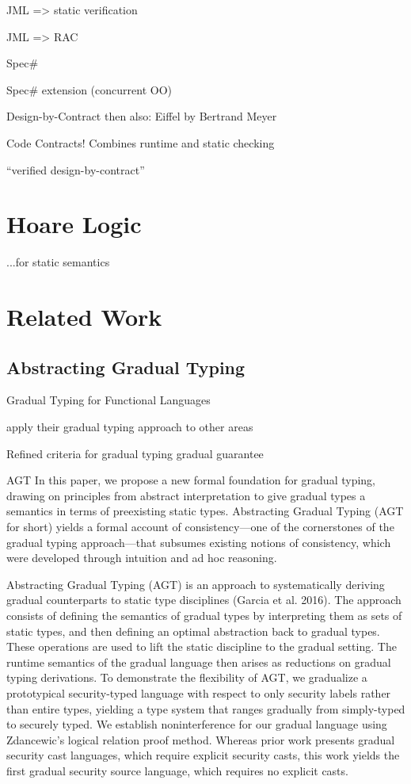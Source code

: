 \cite{jacobs2001logic} JML => static verification

\cite{cheon2002runtime} JML => RAC

\cite{the-spec-programming-system-an-overview} Spec\#

\cite{a-statically-verifiable-programming-model-for-concurrent-object-oriented-programs} Spec\# extension (concurrent OO)

\cite{meyer2002design} Design-by-Contract
then also: Eiffel by Bertrand Meyer 

\cite{embedded-contract-languages} Code Contracts! Combines runtime and static checking

\cite{crocker2004safe} “verified design-by-contract”

\section{Hoare Logic}
...for static semantics

\section{Related Work}
\subsection{Abstracting Gradual Typing}
\cite{siek2006gradual}
Gradual Typing for Functional Languages

apply their gradual typing approach to other areas

\cite{siek2015refined}
Refined criteria for gradual typing
gradual guarantee

\cite{garcia2016abstracting}
AGT
In this paper, we propose a new formal foundation for gradual
typing, drawing on principles from abstract interpretation to
give gradual types a semantics in terms of preexisting static types.
Abstracting Gradual Typing (AGT for short) yields a formal account
of consistency—one of the cornerstones of the gradual typing
approach—that subsumes existing notions of consistency, which
were developed through intuition and ad hoc reasoning.

\cite{garcia2015deriving}
Abstracting Gradual Typing (AGT) is an approach to systematically
deriving gradual counterparts to static type disciplines (Garcia
et al. 2016). The approach consists of defining the semantics of
gradual types by interpreting them as sets of static types, and then
defining an optimal abstraction back to gradual types. These operations
are used to lift the static discipline to the gradual setting. The
runtime semantics of the gradual language then arises as reductions
on gradual typing derivations.
To demonstrate the flexibility of AGT, we gradualize
a prototypical security-typed language
with respect to only security labels rather than entire types, yielding
a type system that ranges gradually from simply-typed to securely typed.
We establish noninterference for our gradual language using Zdancewic’s logical relation proof method.
Whereas prior work presents gradual security cast languages,
which require explicit security casts, this work yields the first gradual
security source language, which requires no explicit casts.

